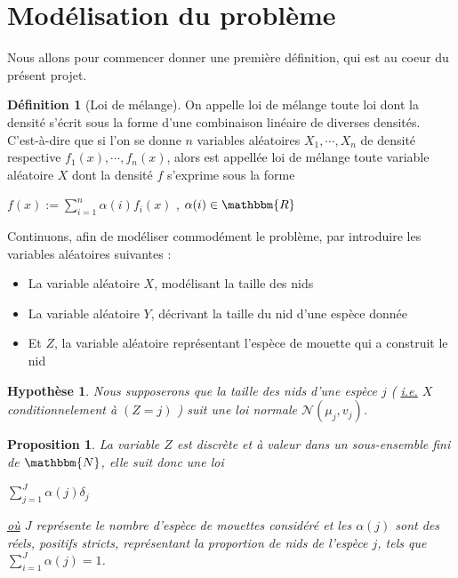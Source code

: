 \documentclass[frenchb]{report}
\newcommand{\R}{\mathbbm{R}}
\newcommand{\N}{\mathbbm{N}}
\newcommand{\1}{\mathbbm{1}}
\newcommand{\n}{\mathcal{N}}
\newtheorem{prop}{Proposition}
\newtheorem{hyp}{Hypothèse}
\theoremstyle{definition}\newtheorem{defn}{Définition}
\theoremstyle{definition}\newtheorem{exm}{Exemple}
\theoremstyle{definition}\newtheorem{nota}{Notation}
\theoremstyle{definition}\newtheorem{rem}{Remarque}
\begin{document}
\section{Modélisation du problème}

Nous allons pour commencer donner une première définition, qui est au coeur du présent projet.

\begin{defn}[Loi de mélange]
On appelle loi de mélange toute loi dont la densité s'écrit sous la forme d'une combinaison linéaire de diverses densités. C'est-à-dire que si l'on se donne $n$ variables aléatoires $X_1, \cdots, X_n$ de densité respective $f_1(x), \cdots, f_n(x)$, alors est appellée loi de mélange toute variable aléatoire $X$ dont la densité $f$ s'exprime sous la forme
\begin{center} $f(x) := \displaystyle\sum_{i=1}^n \alpha(i) f_i(x)$ , $\alpha(i) \in\R$ \end{center}

\end{defn}

Continuons, afin de modéliser commodément le problème, par introduire les variables aléatoires suivantes :

\begin{itemize}[label=\adfflowerleft]
	\item La variable aléatoire $X$, modélisant la taille des nids
	\item La variable aléatoire $Y$, décrivant la taille du nid d'une espèce donnée
	\item Et $Z$, la variable aléatoire représentant l'espèce de mouette qui a construit le nid
\end{itemize}

\begin{hyp}
Nous supposerons que la taille des nids d'une espèce $j$ ( \underline{i.e.} $X$ conditionnelement à $(Z=j)$ ) suit une loi normale $\n(\mu_j,v_j)$. 
\end{hyp}

\begin{prop}
La variable $Z$ est discrète et à valeur dans un sous-ensemble fini de $\N$, elle suit donc une loi 
\begin{center} $\displaystyle \sum_{j=1}^J \alpha(j)\delta_j$ \end{center}
\underline{où} $J$ représente le nombre d'espèce de mouettes considéré et les $\alpha(j)$ sont des réels, positifs stricts, représentant la proportion de nids de l'espèce $j$, tels que $\displaystyle\sum_{i=1}^J \alpha(j) = 1$.
\end{prop}
\end{document}
